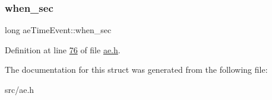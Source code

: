 \subsubsection{\texorpdfstring{when\+\_\+sec}{when\_sec}}
{\footnotesize\ttfamily long ae\+Time\+Event\+::when\+\_\+sec}



Definition at line \hyperlink{ae_8h_source_l00076}{76} of file \hyperlink{ae_8h_source}{ae.\+h}.



The documentation for this struct was generated from the following file\+:\begin{DoxyCompactItemize}
\item 
src/ae.\+h\end{DoxyCompactItemize}
